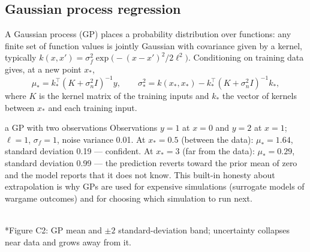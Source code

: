 \documentclass[11pt]{article}
\begin{document}
\subsection{Gaussian process regression}
A Gaussian process (GP) places a probability distribution over functions: any finite set of function values is jointly Gaussian with covariance given by a kernel, typically $k(x,x')=\sigma_f^2\exp\big(-(x-x')^2/2\ell^2\big)$. Conditioning on training data gives, at a new point $x_*$,
\[\mu_*=k_*^\top(K+\sigma_n^2I)^{-1}y,\qquad\sigma_*^2=k(x_*,x_*)-k_*^\top(K+\sigma_n^2I)^{-1}k_*,\]
where $K$ is the kernel matrix of the training inputs and $k_*$ the vector of kernels between $x_*$ and each training input.
\begin{example}{a GP with two observations}
Observations $y=1$ at $x=0$ and $y=2$ at $x=1$; $\ell=1$, $\sigma_f=1$, noise variance 0.01. At $x_*=0.5$ (between the data): $\mu_*=1.64$, standard deviation 0.19 --- confident. At $x_*=3$ (far from the data): $\mu_*=0.29$, standard deviation 0.99 --- the prediction reverts toward the prior mean of zero and the model reports that it does not know. This built-in honesty about extrapolation is why GPs are used for expensive simulations (surrogate models of wargame outcomes) and for choosing which simulation to run next.
\end{example}
\begin{center}\\*{\small\color{GreyN}Figure C2: GP mean and $\pm2$ standard-deviation band; uncertainty collapses near data and grows away from it.}\end{center}
\end{document}
